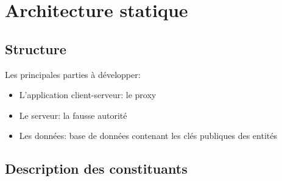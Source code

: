 \documentclass[a4paper,11pt,french]{article}
\begin{document}
\section{Architecture statique}

\subsection{Structure}
Les principales parties à développer:
\begin{itemize}
\item L'application client-serveur: le proxy
\item Le serveur: la fausse autorité 
\item Les données: base de données contenant les clés publiques des entités
\end{itemize}


\subsection{Description des constituants}
\end{document}
